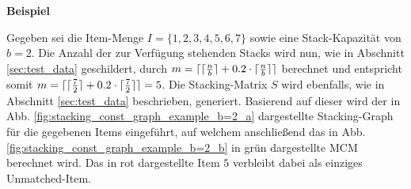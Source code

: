 \textbf{Beispiel}

Gegeben sei die Item-Menge $I = \{1, 2, 3, 4, 5, 6, 7\}$ sowie eine Stack-Kapazität von $b = 2$.
Die Anzahl der zur Verfügung stehenden Stacks wird nun, wie in Abschnitt \ref{sec:test_data} geschildert,
durch $m = \lceil\lceil\frac{n}{b}\rceil + 0.2 \cdot \lceil\frac{n}{b}\rceil\rceil$ berechnet und entspricht somit
$m = \lceil\lceil\frac{7}{2}\rceil + 0.2 \cdot \lceil\frac{7}{2}\rceil\rceil = 5$.
Die Stacking-Matrix $S$ wird ebenfalls, wie in Abschnitt \ref{sec:test_data} beschrieben, generiert.
Basierend auf dieser wird der in Abb. \ref{fig:stacking_const_graph_example_b=2_a} dargestellte Stacking-Graph
für die gegebenen Items eingeführt, auf welchem anschließend das in Abb. \ref{fig:stacking_const_graph_example_b=2_b} in grün dargestellte \textsc{MCM} berechnet wird. Das in rot dargestellte Item $5$ verbleibt dabei als einziges Unmatched-Item.

\vfill
\pagebreak

